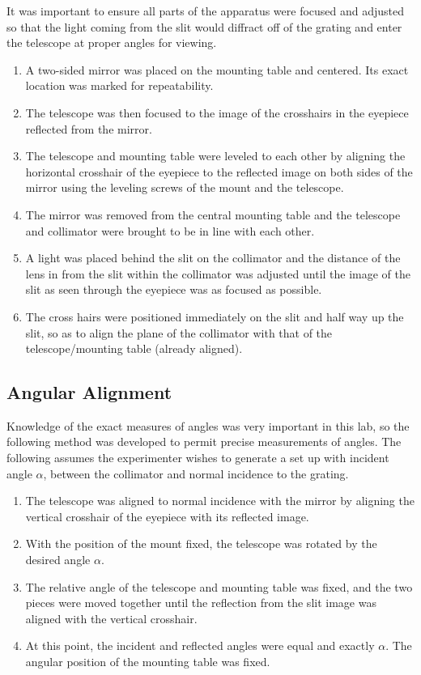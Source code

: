 \documentclass[paper=a4, fontsize=11pt]{scrartcl} %
\numberwithin{equation}{section}
\numberwithin{figure}{section}
\numberwithin{table}{section}
\begin{document}
It was important to ensure all parts of the apparatus were focused and adjusted so that the light coming from the slit would diffract off of the grating and enter the telescope at proper angles for viewing.

\begin{enumerate}
\item A two-sided mirror was placed on the mounting table and centered. Its exact location was marked for repeatability.
\item The telescope was then focused to the image of the crosshairs in
  the eyepiece reflected from the mirror.
\item The telescope and mounting table were leveled to each other by
  aligning the horizontal crosshair of the eyepiece to the reflected
  image on both sides of the mirror using the leveling screws of the
  mount and the telescope.
\item The mirror was removed from the central mounting table and the telescope and collimator were brought to be in line with each other.
\item A light was placed behind the slit on the collimator and the distance of the lens in from the slit within the collimator was adjusted until the image of the slit as seen through the eyepiece was as focused as possible.
\item The cross hairs were positioned immediately on the slit and half way up the slit, so as to align the plane of the collimator with that of the telescope/mounting table (already aligned).
\end{enumerate}


\subsection{Angular Alignment}
\label{sec:angal}
Knowledge of the exact measures of angles was very important in this
lab, so the following method was developed to permit precise
measurements of angles. The following assumes the experimenter wishes
to generate a set up with incident angle $\alpha$, between the
collimator and normal incidence to the grating.

\begin{enumerate}
\item The telescope was aligned to normal incidence with the mirror by
  aligning the vertical crosshair of the eyepiece with its reflected image. 
\item With the position of the mount fixed, the telescope was rotated
  by the desired angle $\alpha$.
\item The relative angle of the telescope and mounting table was
  fixed, and the two pieces were moved together until the reflection
  from the slit image was aligned with the vertical crosshair. 
\item At this point, the incident and reflected angles were equal and exactly $\alpha$. The angular position of the mounting table was fixed.
\end{enumerate}
\end{document}
